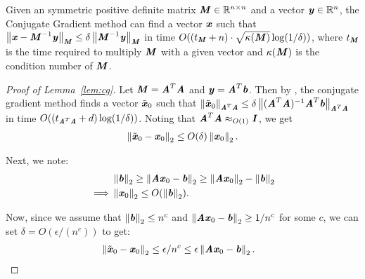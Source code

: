 \begin{theorem}\label{thm:cg}
	Given an symmetric positive definite matrix $\MM \in \R^{n \times n}$ and a vector $\yy\in \R^{n}$, the Conjugate Gradient method can find a vector $\xx$ such that $\norm{\xx - \MM^{-1} \yy}_{\MM} \le \delta \norm{\MM^{-1} \yy}_{\MM}$ in time $O( (t_{\MM} + n) \cdot \sqrt{\kappa(\MM)} \log (1/\delta))$, where $t_{\MM}$ is the time required to multiply $\MM$ with a given vector and $\kappa(\MM)$ is the condition number of $\MM$.
\end{theorem}


\begin{proof}[Proof of Lemma~\ref{lem:cg}]
Let $\MM = \AA^T \AA$ and $\yy = \AA^T \bb$. Then by ,
the conjugate gradient method finds a vector $\tilde{\xx}_0$ such that
$\norm{\tilde{\xx}_0}_{\AA^T \AA} \le \delta \norm{(\AA^T \AA)^{-1} \AA^T \bb}_{\AA^T \AA}$
in time $O((t_{\AA^T \AA} + d) \log (1/\delta))$.
Noting that $\AA^T \AA \approx_{O(1)} \II$, we get
\begin{align*}
\norme{\tilde{\xx}_0 - \xx_0} \le  O(\delta) \norme{\xx_0}.
\end{align*}

Next, we note:
\begin{align*}
& \norme{\bb} \ge \norme{\AA \xx_0 - \bb} \ge \norme{\AA \xx_0} - \norme{\bb} \\
\implies & \norme{\xx_0} \le O(\norme{\bb}).
\end{align*}

Now, since we assume that $\norme{\bb} \le n^c$ and $\norme{\AA \xx_0 - \bb} \ge 1/n^c$ for some $c$,
we can set $\delta = O(\epsilon/(n^c))$ to get:
\begin{align*}
& \norme{\tilde{\xx}_0 - \xx_0} \le \epsilon/n^c \le \epsilon \norme{\AA\xx_0 - \bb}. 
\end{align*}
\end{proof}

